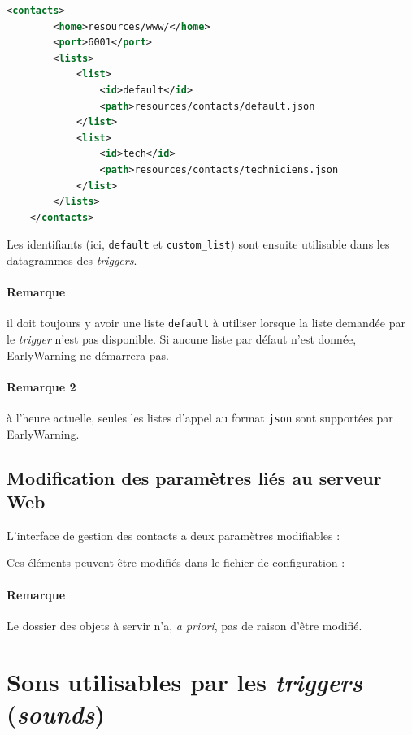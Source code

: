 \documentclass{article}
\begin{document}
\begin{lstlisting}[language=xml,name=Exemple de configuration des listes]
    <contacts>
        <home>resources/www/</home>
        <port>6001</port> 
        <lists>
            <list>
                <id>default</id>
                <path>resources/contacts/default.json
            </list>
            <list>
                <id>tech</id>
                <path>resources/contacts/techniciens.json
            </list>
        </lists>
    </contacts>
\end{lstlisting}



Les identifiants (ici, \texttt{default} et \texttt{custom\_list}) sont ensuite utilisable dans les datagrammes des \emph{triggers}.

\paragraph{Remarque} il doit toujours y avoir une liste \texttt{default} à utiliser lorsque la liste demandée par le \emph{trigger} n'est pas disponible. Si aucune liste par défaut n'est donnée, EarlyWarning ne démarrera pas.

\paragraph{Remarque 2} à l'heure actuelle, seules les listes d'appel au format \texttt{json} sont supportées par EarlyWarning. 

\subsection{Modification des paramètres liés au serveur Web}

L'interface de gestion des contacts a deux paramètres modifiables :

Ces éléments peuvent être modifiés dans le fichier de configuration :


\paragraph{Remarque} Le dossier des objets à servir n'a, \emph{a priori}, pas de raison d'être modifié.

\pagebreak
\section{Sons utilisables par les \emph{triggers} (\emph{sounds})}
\end{document}
